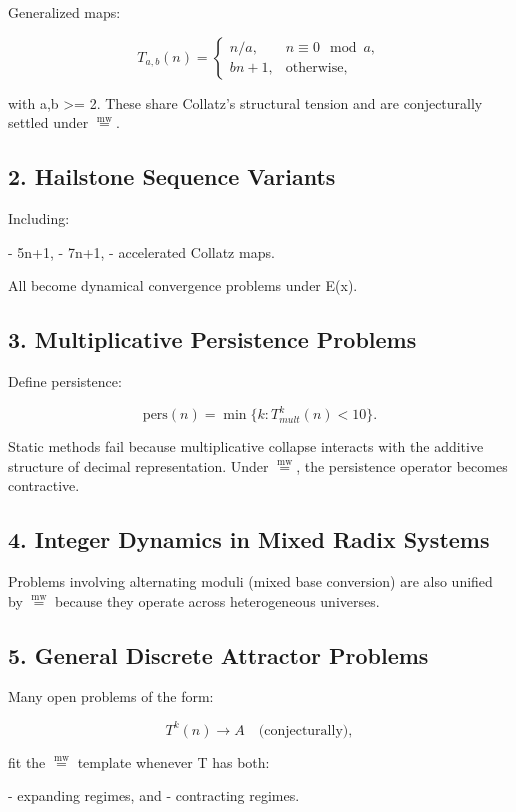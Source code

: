 \documentclass[11pt]{article}
\newcommand{\mweq}{\mathrel{\overset{\mathrm{mw}}{=}}}
\theoremstyle{definition}
\theoremstyle{remark}
\begin{document}
Generalized maps:

\[
  T_{a,b}(n) =
  \begin{cases}
     n/a, & n \equiv 0 \mod a, \\
     bn + 1, & \text{otherwise},
  \end{cases}
\]

with a,b >= 2.  
These share Collatz's structural tension and are conjecturally settled
under $\mweq$.

\subsection{2. Hailstone Sequence Variants}

Including:

- 5n+1,  
- 7n+1,  
- accelerated Collatz maps.

All become dynamical convergence problems under E(x).

\subsection{3. Multiplicative Persistence Problems}

Define persistence:

\[
  \text{pers}(n) = \min \{k : T_{mult}^{k}(n) < 10\}.
\]

Static methods fail because multiplicative collapse interacts with the
additive structure of decimal representation.  
Under $\mweq$, the persistence operator becomes contractive.

\subsection{4. Integer Dynamics in Mixed Radix Systems}

Problems involving alternating moduli (mixed base conversion) are also
unified by $\mweq$ because they operate across heterogeneous universes.

\subsection{5. General Discrete Attractor Problems}

Many open problems of the form:

\[
  T^{k}(n) \to A \quad \text{(conjecturally)},
\]

fit the $\mweq$ template whenever T has both:

- expanding regimes, and  
- contracting regimes.
\end{document}
